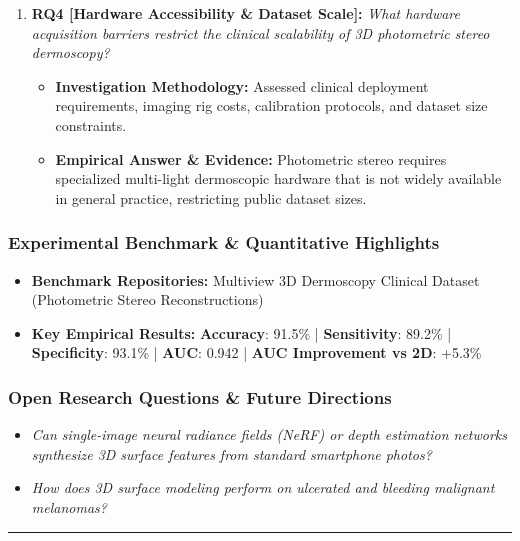 \begin{enumerate}[label=\textbf{\arabic*.}, leftmargin=*]
\begin{itemize}[leftmargin=1.5em]
    \item \textbf{Empirical Answer \& Evidence:} Combined 2D+3D models consistently outperformed unimodal 2D baselines, particularly in distinguishing elevated nodular melanoma from flat benign nevi.
  \end{itemize}
  \item \textbf{RQ4 [Hardware Accessibility \& Dataset Scale]:} \textit{What hardware acquisition barriers restrict the clinical scalability of 3D photometric stereo dermoscopy?}
  \begin{itemize}[leftmargin=1.5em]
    \item \textbf{Investigation Methodology:} Assessed clinical deployment requirements, imaging rig costs, calibration protocols, and dataset size constraints.
    \item \textbf{Empirical Answer \& Evidence:} Photometric stereo requires specialized multi-light dermoscopic hardware that is not widely available in general practice, restricting public dataset sizes.
  \end{itemize}
\end{enumerate}

\subsubsection*{Experimental Benchmark \& Quantitative Highlights}
\begin{itemize}[leftmargin=*]
  \item \textbf{Benchmark Repositories:} Multiview 3D Dermoscopy Clinical Dataset (Photometric Stereo Reconstructions)
  \item \textbf{Key Empirical Results:} \textbf{Accuracy}: 91.5\% \quad | \quad \textbf{Sensitivity}: 89.2\% \quad | \quad \textbf{Specificity}: 93.1\% \quad | \quad \textbf{AUC}: 0.942 \quad | \quad \textbf{AUC Improvement vs 2D}: +5.3\%
\end{itemize}

\subsubsection*{Open Research Questions \& Future Directions}
\begin{itemize}[leftmargin=*]
  \item \textit{Can single-image neural radiance fields (NeRF) or depth estimation networks synthesize 3D surface features from standard smartphone photos?}
  \item \textit{How does 3D surface modeling perform on ulcerated and bleeding malignant melanomas?}
\end{itemize}
\vspace{0.8em}\hrule\vspace{1.2em}
